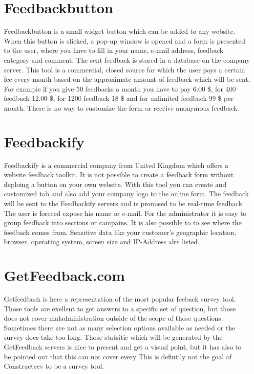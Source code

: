 \section{Feedbackbutton}
Feedbackbutton is a small widget button which can be added to any website. When this button is clicked, a pop-up window is opened and a form is presented to the user, where you have to fill in your name, e-mail address, feedback category and comment. The sent feedback is stored in a database on the company server. This tool is a commercial, closed source for which the user pays a certain fee every month based on the approximate amount of feedback which will be sent. For example if you give 50 feedbacks a month you have to pay 6.00 \$, for 400 feedback 12.00 \$, for 1200 feedback 18 \$ and for unlimited feedback 99 \$ per month. There is no way to customize the form or receive anonymous feedback. 
\section{Feedbackify}
Feedbackify is a commercial company from United Kingdom which offers a website feedback toolkit. It is not possible to create a feedback form without deploing a button on your own website. With this tool you can create and customized tab and also add your company logo to the online form. The feedback will be sent to the Feedbackify servers and is promised to be real-time feedback. The user is foreced expose his name or e-mail.  For the administrator it is easy to group feedback into sections or campains. It is also possible to to see where the feedback comes from. Sensitive data like your customer's geographic location, browser, operating system, screen size and IP-Address alre listed.

\section{GetFeedback.com}
Getfeedback is here a representation of the most popular feeback survey tool. Those tools are exellent to get answers to a specific set of question, but those does not cover maladministration outside of the scope of those questions. Sometimes there are not as many selection options available as needed or the survey does take too long. Those statsitic which will be generated by the GetFeedback servers is nice to present and get a visual point, but it has also to be pointed out that this can not cover every This is defintily not the goal of Constructeev to be a survey tool. 

